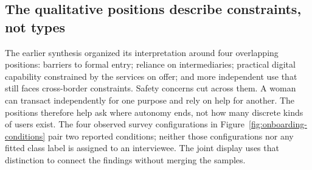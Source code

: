 \subsection{The qualitative positions describe constraints, not types}
\label{sec:migrant-positions}

The earlier synthesis organized its interpretation around four overlapping positions: barriers to formal entry; reliance on intermediaries; practical digital capability constrained by the services on offer; and more independent use that still faces cross-border constraints. Safety concerns cut across them. A woman can transact independently for one purpose and rely on help for another. The positions therefore help ask where autonomy ends, not how many discrete kinds of users exist. The four observed survey configurations in Figure~\ref{fig:onboarding-conditions} pair two reported conditions; neither those configurations nor any fitted class label is assigned to an interviewee. The joint display uses that distinction to connect the findings without merging the samples.
